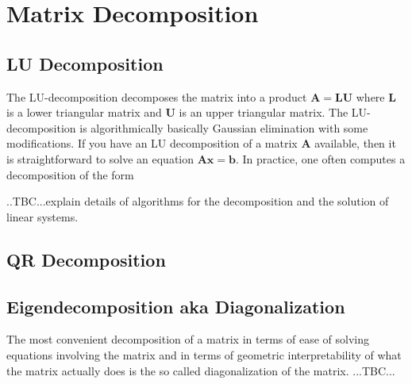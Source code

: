 \section{Matrix Decomposition}




\subsection{LU Decomposition}
The LU-decomposition decomposes the matrix into a product $\mathbf{A = L U}$ where $\mathbf{L}$ is a lower triangular matrix and $\mathbf{U}$ is an upper triangular matrix. The LU-decomposition is algorithmically basically Gaussian elimination with some modifications. If you have an LU decomposition of a matrix $\mathbf{A}$ available, then it is straightforward to solve an equation $\mathbf{Ax = b}$. In practice, one often computes a decomposition of the form 

..TBC...explain details of algorithms for the decomposition and the solution of linear systems.


\subsection{QR Decomposition}


\subsection{Eigendecomposition aka Diagonalization}
The most convenient decomposition of a matrix in terms of ease of solving equations involving the matrix and in terms of geometric interpretability of what the matrix actually does is the so called diagonalization of the matrix. ...TBC...



